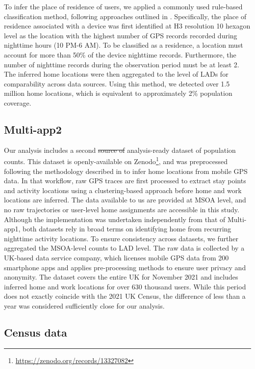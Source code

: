 \documentclass[]{rsos}%
\providecommand{\DIFdel}[1]{{\protect\color{red}\sout{#1}}}                      %
\providecommand{\DIFdelbegin}{} %
\providecommand{\DIFdelend}{} %
\begin{document}
To infer the place of residence of users, we applied a commonly used
rule-based classification method, following approaches outlined in
\citep{zhong25, unstatsMPDMS2025, Verma2024}. Specifically, the place of
residence associated with a device was first identified at H3 resolution
10 hexagon level as the location with the highest number of GPS records
recorded during nighttime hours (10 PM-6 AM). To be classified as a
residence, a location must account for more than 50\% of the device
nighttime records. Furthermore, the number of nighttime records during
the observation period must be at least 2. The inferred home locations
were then aggregated to the level of LADs for comparability across data
sources. Using this method, we detected over 1.5 million home locations,
which is equivalent to approximately 2\% population coverage.

\subsection{Multi-app2}\label{multi-app2}

Our analysis includes a second \DIFdelbegin \DIFdel{source of }\DIFdelend analysis-ready dataset of
population counts. This dataset is openly-available on Zenodo\footnote{\url{https://zenodo.org/records/13327082}}, and
was preprocessed following the methodology described in \citep{zhong25} to
infer home locations from mobile GPS data. In that workflow, raw GPS
traces are first processed to extract stay points and activity locations
using a clustering-based approach before home and work locations are
inferred. The data available to us are provided at MSOA level, and no
raw trajectories or user-level home assignments are accessible in this
study. Although the implementation was undertaken independently from
that of Multi-app1, both datasets rely in broad terms on identifying
home from recurring nighttime activity locations. To ensure consistency
across datasets, we further aggregated the MSOA-level counts to LAD
level. The raw data is collected by a UK-based data service company,
which licenses mobile GPS data from 200 smartphone apps and applies
pre-processing methods to ensure user privacy and anonymity. The dataset
covers the entire UK for November 2021 and includes inferred home and
work locations for over 630 thousand users. While this period does not
exactly coincide with the 2021 UK Census, the difference of less than a
year was considered sufficiently close for our analysis.

\subsection{Census data}\label{census-data}
\end{document}
